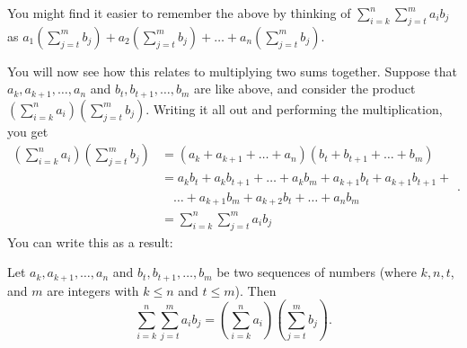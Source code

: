 \documentclass[
  12pt,
  a4paper, oneside]{starmastarticle}
\begin{document}
\begin{tcolorbox}[enhanced jigsaw, colframe=quarto-callout-tip-color-frame, opacitybacktitle=0.6, rightrule=.15mm, toptitle=1mm, bottomtitle=1mm, toprule=.15mm, leftrule=.75mm, title=\textcolor{quarto-callout-tip-color}{\faLightbulb}\hspace{0.5em}{Tip}, breakable, coltitle=black, titlerule=0mm, opacityback=0, colback=white, bottomrule=.15mm, left=2mm, colbacktitle=quarto-callout-tip-color!10!white, arc=.35mm]
You might find it easier to remember the above by thinking of
\(\sum_{i=k}^n\sum_{j=t}^m a_i b_j\) as
\(a_1(\sum_{j=t}^mb_j) + a_2(\sum_{j=t}^mb_j) + \ldots + a_n(\sum_{j=t}^mb_j).\)
\end{tcolorbox}

You will now see how this relates to multiplying two sums together.
Suppose that \(a_k,a_{k+1},\ldots,a_n\) and \(b_t,b_{t+1},\ldots,b_m\)
are like above, and consider the product
\((\sum_{i=k}^na_i)(\sum_{j=t}^mb_j)\). Writing it all out and
performing the multiplication, you get
\[\begin{equation}\begin{split} (\sum_{i=k}^na_i)(\sum_{j=t}^mb_j) &= (a_k+a_{k+1}+\ldots+a_n)(b_t + b_{t+1}+\ldots+b_m) \\ &= a_kb_t + a_kb_{t+1} + \ldots + a_kb_m + a_{k+1}b_t + a_{k+1}b_{t+1} + \\ & \quad \ldots + a_{k+1}b_m + a_{k+2}b_t + \ldots + a_nb_m \\ &= \sum_{i=k}^n\sum_{j=t}^m a_i b_j\end{split}.\end{equation}\]
You can write this as a result:

\begin{tcolorbox}[enhanced jigsaw, colframe=quarto-callout-note-color-frame, opacitybacktitle=0.6, rightrule=.15mm, toptitle=1mm, bottomtitle=1mm, toprule=.15mm, leftrule=.75mm, title=\textcolor{quarto-callout-note-color}{\faInfo}\hspace{0.5em}{Double sums and products of two sums}, breakable, coltitle=black, titlerule=0mm, opacityback=0, colback=white, bottomrule=.15mm, left=2mm, colbacktitle=quarto-callout-note-color!10!white, arc=.35mm]
Let \(a_{k},a_{k+1},\ldots,a_n\) and \(b_t,b_{t+1},\ldots,b_m\) be two
sequences of numbers (where \(k,n,t\), and \(m\) are integers with
\(k \leq n\) and \(t \leq m\)). Then
\[\sum_{i=k}^n\sum_{j=t}^m a_i b_j = (\sum_{i=k}^na_i)(\sum_{j=t}^mb_j).\]
\end{tcolorbox}
\end{document}
